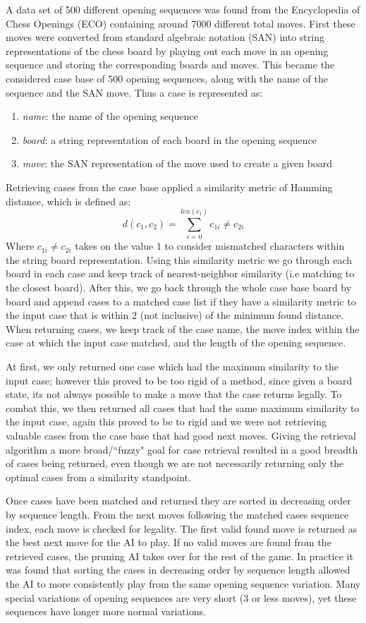 \documentclass[letterpaper]{article}
\begin{document}
A data set of 500 different opening sequences was found from the Encyclopedia of Chess Openings (ECO) containing around 7000 different total moves. First these moves were converted from standard algebraic notation (SAN) into string representations of the chess board by playing out each move in an opening sequence and storing the corresponding boards and moves. This became the considered case base of 500 opening sequences, along with the name of the sequence and the SAN move. Thus a case is represented as:
\begin{enumerate}[i]
    \item \textit{name}: the name of the opening sequence
    \item \textit{board}: a string representation of each board in the opening sequence
    \item \textit{move}: the SAN representation of the move used to create a given board
\end{enumerate}
Retrieving cases from the case base applied a similarity metric of Hamming distance, which is defined as:
$$
d(c_1,c_2) = \sum_{i=0}^{len(c_1)} c_{1i} \neq c_{2i}
$$
Where $c_{1i} \neq c_{2i}$ takes on the value $1$ to consider mismatched characters within the string board representation. Using this similarity metric we go through each board in each case and keep track of nearest-neighbor similarity (i.e matching to the closest board). After this, we go back through the whole case base board by board and append cases to a matched case list if they have a similarity metric to the input case that is within $2$ (not inclusive) of the minimum found distance. When returning cases, we keep track of the case name, the move index within the case at which the input case matched, and the length of the opening sequence.

At first, we only returned one case which had the maximum similarity to the input case; however this proved to be too rigid of a method, since given a board state, its not always possible to make a move that the case returns legally. To combat this, we then returned all cases that had the same maximum similarity to the input case, again this proved to be to rigid and we were not retrieving valuable cases from the case base that had good next moves. Giving the retrieval algorithm a more broad/``fuzzy" goal for case retrieval resulted in a good breadth of cases being returned, even though we are not necessarily returning only the optimal cases from a similarity standpoint. 

Once cases have been matched and returned they are sorted in decreasing order by sequence length. From the next moves following the matched cases sequence index, each move is checked for legality. The first valid found move is returned as the best next move for the AI to play. If no valid moves are found from the retrieved cases, the pruning AI takes over for the rest of the game.  In practice it was found that sorting the cases in decreasing order by sequence length allowed the AI to more consistently play from the same opening sequence variation. Many special variations of opening sequences are very short (3 or less moves), yet these sequences have longer more normal variations.
\end{document}

